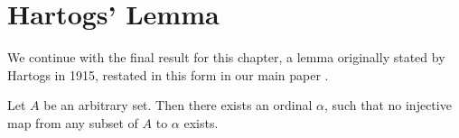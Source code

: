 \documentclass[../../main.tex]{subfiles}
\begin{document}
\section{Hartogs' Lemma}
We continue with the final result for this chapter, 
a lemma originally stated by Hartogs in 1915, restated in this form in our main paper \cite{Haj72}.

\begin{lemma}\cite{Har15}
    Let $A$ be an arbitrary set.
    Then there exists an ordinal $\alpha$, 
    such that no injective map from any subset of $A$ to $\alpha$ exists. %
\end{lemma}
\end{document}

